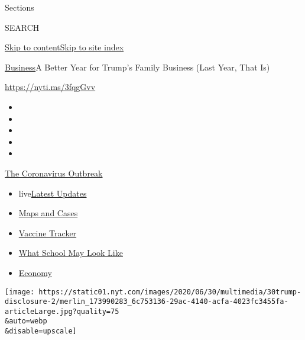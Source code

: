 Sections

SEARCH

\protect\hyperlink{site-content}{Skip to
content}\protect\hyperlink{site-index}{Skip to site index}

\href{/section/business}{Business}\textbar{}A Better Year for Trump's
Family Business (Last Year, That Is)

\url{https://nyti.ms/3fqgGvv}

\begin{itemize}
\item
\item
\item
\item
\item
\end{itemize}

\href{https://www.nytimes.com/news-event/coronavirus?action=click\&pgtype=Article\&state=default\&region=TOP_BANNER\&context=storylines_menu}{The
Coronavirus Outbreak}

\begin{itemize}
\tightlist
\item
  live\href{https://www.nytimes.com/2020/08/01/world/coronavirus-covid-19.html?action=click\&pgtype=Article\&state=default\&region=TOP_BANNER\&context=storylines_menu}{Latest
  Updates}
\item
  \href{https://www.nytimes.com/interactive/2020/us/coronavirus-us-cases.html?action=click\&pgtype=Article\&state=default\&region=TOP_BANNER\&context=storylines_menu}{Maps
  and Cases}
\item
  \href{https://www.nytimes.com/interactive/2020/science/coronavirus-vaccine-tracker.html?action=click\&pgtype=Article\&state=default\&region=TOP_BANNER\&context=storylines_menu}{Vaccine
  Tracker}
\item
  \href{https://www.nytimes.com/interactive/2020/07/29/us/schools-reopening-coronavirus.html?action=click\&pgtype=Article\&state=default\&region=TOP_BANNER\&context=storylines_menu}{What
  School May Look Like}
\item
  \href{https://www.nytimes.com/live/2020/07/31/business/stock-market-today-coronavirus?action=click\&pgtype=Article\&state=default\&region=TOP_BANNER\&context=storylines_menu}{Economy}
\end{itemize}

\texttt{[image: https://static01.nyt.com/images/2020/06/30/multimedia/30trump-disclosure-2/merlin\_173990283\_6c753136-29ac-4140-acfa-4023fc3455fa-articleLarge.jpg?quality=75\\\&auto=webp\\\&disable=upscale]}

